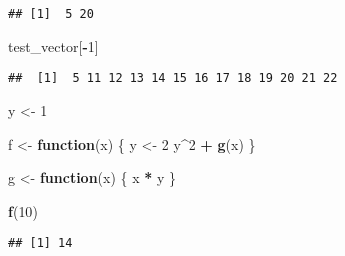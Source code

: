 \documentclass[
]{article}
\newenvironment{Shaded}{\begin{snugshade}}{\end{snugshade}}
\newcommand{\ControlFlowTok}[1]{\textcolor[rgb]{0.13,0.29,0.53}{\textbf{#1}}}
\newcommand{\DecValTok}[1]{\textcolor[rgb]{0.00,0.00,0.81}{#1}}
\newcommand{\FunctionTok}[1]{\textcolor[rgb]{0.13,0.29,0.53}{\textbf{#1}}}
\newcommand{\NormalTok}[1]{#1}
\newcommand{\OtherTok}[1]{\textcolor[rgb]{0.56,0.35,0.01}{#1}}
\newcommand{\SpecialCharTok}[1]{\textcolor[rgb]{0.81,0.36,0.00}{\textbf{#1}}}
\begin{document}
\begin{verbatim}
## [1]  5 20
\end{verbatim}

\begin{Shaded}
\begin{Highlighting}[]
\NormalTok{test\_vector[}\SpecialCharTok{{-}}\DecValTok{1}\NormalTok{]}
\end{Highlighting}
\end{Shaded}

\begin{verbatim}
##  [1]  5 11 12 13 14 15 16 17 18 19 20 21 22
\end{verbatim}

\begin{Shaded}
\begin{Highlighting}[]
\NormalTok{y }\OtherTok{\textless{}{-}} \DecValTok{1}

\NormalTok{f }\OtherTok{\textless{}{-}} \ControlFlowTok{function}\NormalTok{(x) \{}
\NormalTok{  y }\OtherTok{\textless{}{-}} \DecValTok{2}
\NormalTok{  y}\SpecialCharTok{\^{}}\DecValTok{2} \SpecialCharTok{+} \FunctionTok{g}\NormalTok{(x)}
\NormalTok{\}}

\NormalTok{g }\OtherTok{\textless{}{-}} \ControlFlowTok{function}\NormalTok{(x) \{}
\NormalTok{  x }\SpecialCharTok{*}\NormalTok{ y}
\NormalTok{\}}

\FunctionTok{f}\NormalTok{(}\DecValTok{10}\NormalTok{)}
\end{Highlighting}
\end{Shaded}

\begin{verbatim}
## [1] 14
\end{verbatim}
\end{document}
